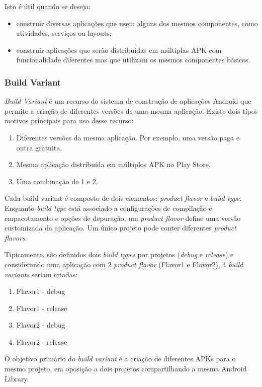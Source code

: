 Isto é útil quando se deseja:
\begin{itemize}
    \item construir diversas aplicações que usem alguns dos mesmos componentes,
        como atividades, serviços ou layouts;
    \item construir aplicações que serão distribuídas em múltiplas APK com
        funcionalidade diferentes mas que utilizam os mesmos componentes básicos.
\end{itemize}

\subsubsection{Build Variant}
\textit{Build Variant} é um recurso do sistema de construção de aplicações Android
que permite a criação de diferentes versões de uma mesma aplicação. Existe dois
tipos motivos principais para uso desse recurso:
\begin{enumerate}
    \item Diferentes versões da mesma aplicação. Por exemplo, uma versão paga e
        outra gratuita.
    \item Mesma aplicação distribuída em múltiplos APK no Play Store.
    \item Uma combinação de 1 e 2.
\end{enumerate}

Cada build variant é composto de dois elementos: \textit{product flavor} e
\textit{build type}. Enquanto \textit{build type} está associado a configurações
de compilação e empacotamento e opções de depuração, um \textit{product flavor}
define uma versão customizada da aplicação. Um único projeto pode conter
diferentes \textit{product flavors}.

Tipicamente, são definidos dois \textit{build types} por projetos (\textit{debug}
e \textit{release}) e
considerando uma aplicação com 2 \textit{product flavor} (Flavor1 e Flavor2),
4 \textit{build variants} seriam criadas:
\begin{enumerate}
    \item Flavor1 - debug
    \item Flavor1 - release
    \item Flavor2 - debug
    \item Flavor2 - release
\end{enumerate}

O objetivo primário do \textit{build variant} é a criação de diferentes APKs
para o mesmo projeto, em oposição a dois projetos compartilhando a mesma Android Library.

